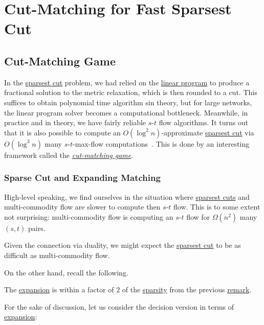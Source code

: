 \chapter{Cut-Matching for Fast Sparsest Cut}
\section{Cut-Matching Game}
In the \hyperref[prb:sparsest-cut]{sparsest cut} problem, we had relied on the \hyperref[eq:non-uniform-sparsest-cut-LP-dual]{linear program} to produce a fractional solution to the metric relaxation, which is then rounded to a cut. This suffices to obtain polynomial time algorithm sin theory, but for large networks, the linear program solver becomes a computational bottleneck. Meanwhile, in practice and in theory, we have fairly reliable \(s\)-\(t\) flow algorithms. It turns out that it is also possible to compute an \(O(\log ^2 n)\)-approximate \hyperref[prb:sparsest-cut]{sparsest cut} via \(O(\log ^3 n)\) many \(s\)-\(t\)-max-flow computations~\cite{khandekar2009graph}. This is done by an interesting framework called the \hyperref[def:cut-matching-game]{\emph{cut-matching game}}.

\subsection{Sparse Cut and Expanding Matching}
High-level speaking, we find ourselves in the situation where \hyperref[prb:sparsest-cut]{sparsest cuts} and multi-commodity flow are slower to compute then \(s\)-\(t\) flow. This is to some extent not surprising: multi-commodity flow is computing an \(s\)-\(t\) flow for \(\Omega (n^2)\) many \((s, t)\) pairs.

\begin{intuition}
	Given the connection via duality, we might expect the \hyperref[prb:sparsest-cut]{sparsest cut} to be as difficult as multi-commodity flow.
\end{intuition}

On the other hand, recall the following.

\begin{prev}
	The \hyperref[def:expansion]{expansion} is within a factor of \(2\) of the \hyperref[def:sparsity]{sparsity} from the previous \hyperref[rmk:expansion-sparsity]{remark}.
\end{prev}

For the sake of discussion, let us consider the decision version in terms of \hyperref[def:expansion]{expansion}:

